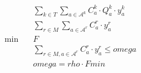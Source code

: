 \begin{align}
  & \sum_{k \in T} \underset{a \in \mathbf{\mathcal{A}}^{k}}{\sum} C_{a}^{k} \cdot Q_{a}^{k} \cdot y_{a}^{k} \tag{eq\_0011\_a} \\
  & \sum_{r \in M} \underset{a \in \mathbf{\mathcal{A}}^{r}}{\sum} C_{a}^{r} \cdot y_{a}^{r} \tag{eq\_0011\_b} \\
  \min\quad & F \tag{eq\_0012} \\
  & \sum_{r \in M, a \in \mathcal{A}^{r}} C_{a}^{r} \cdot y_{a}^{r} \leq \mathit{omega} \tag{eq\_0013\_a} \\
  & \mathit{omega} = \mathit{rho} \cdot Fmin \tag{eq\_0013\_b} \\
\end{align}
